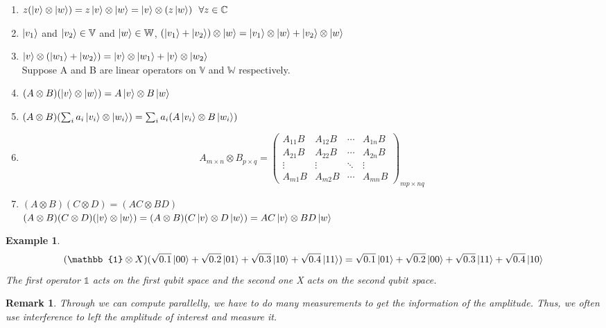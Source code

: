 \documentclass[]{book}
\newtheorem*{remark}{Remark}
\newtheorem*{example}{Example}
\theoremstyle{nonumberplain}
\begin{document}
\begin{enumerate}
	\item $z(\ket{v}\otimes\ket{w}) = z\ket{v}\otimes\ket{w}=\ket{v}\otimes (z\ket{w})\ \ \forall z \in \mathbb{C}$
	\item $\ket{v_{1}}$ and $\ket{v_{2}} \in \mathbb{V}$ and $\ket{w}\in\mathbb{W}$, $(\ket{v_{1}}+\ket{v_{2}})\otimes \ket{w}=\ket{v_{1}}\otimes\ket{w}+\ket{v_{2}}\otimes\ket{w}$
	\item $\ket{v}\otimes(\ket{w_{1}}+\ket{w_{2}})= \ket{v}\otimes\ket{w_{1}}+\ket{v}\otimes\ket{w_{2}}$\\

		Suppose A and B are linear operators on $\mathbb{V}$ and $\mathbb{W}$ respectively.
	\item $(A\otimes B)(\ket{v}\otimes\ket{w})=A\ket{v}\otimes B\ket{w}$ 
	\item $(A\otimes B)( \sum^{}_{i} a_{i}\ket{v_{i}}\otimes\ket{w_{i}})= \sum^{}_{i} a_{i}(A\ket{v_{i}}\otimes B\ket{w_{i}})$ 
	\item
	\[
		A_{m\times n} \otimes B_{p \times q} = \begin{pmatrix} A_{11}B&A_{12}B&\cdots&A_{1n}B\\
		A_{21}B&A_{22}B&\cdots&A_{2n}B\\
		\vdots&\vdots&\ddots&\vdots\\
		A_{m1}B&A_{m2}B&\cdots&A_{mn}B
	\end{pmatrix}_{mp\times nq}
	\] 
        \item $(A\otimes B)(C\otimes D)= (AC\otimes BD)$\\ $ (A\otimes B)(C\otimes D)(\ket{v}\otimes\ket{w})=(A\otimes B)(C\ket{v}\otimes D\ket{w})=AC\ket{v}\otimes BD\ket{w}$
\end{enumerate}
\begin{example}
\[
	(\mathbb{1}\otimes X)(\sqrt{0.1}\ket{00}+\sqrt{0.2}\ket{01}+\sqrt{0.3}\ket{10}+\sqrt{0.4}\ket{11})
= \sqrt{0.1}\ket{01}+\sqrt{0.2}\ket{00}+\sqrt{0.3}\ket{11}+\sqrt{0.4}\ket{10}
\] 
The first operator $\mathbb{1}$ acts on the first qubit space and the second one X acts on the second qubit space.  
\end{example}
\begin{remark}
Through we can compute parallelly, we have to do many measurements to get the information of the amplitude. Thus, we often use interference to left the amplitude of interest and measure it.
\end{remark}
\end{document}
